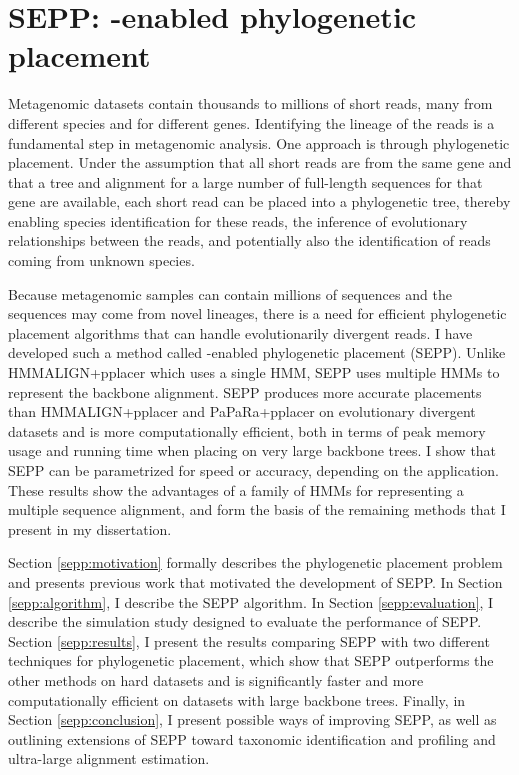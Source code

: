 \chapter{SEPP: \sate-enabled phylogenetic placement}\label{sepp_chapter}
%
Metagenomic datasets contain thousands to millions of short
reads, many from different species and for different genes.
Identifying the lineage of the reads is a fundamental step
in metagenomic analysis.  One approach is through phylogenetic
placement.  Under the assumption that all short reads are from
the same gene and that a tree and alignment for a large
number of full-length sequences for that gene are 
available, each short read  can be placed into a phylogenetic
tree, thereby enabling species identification for these reads, 
the inference of evolutionary relationships between
the reads, and potentially also the identification of reads coming
from unknown species.  

Because metagenomic samples can contain millions of sequences and the sequences may come from novel lineages, there is a need for efficient phylogenetic placement algorithms that can handle evolutionarily divergent reads.  I
have developed such a method called \sate-enabled phylogenetic placement (SEPP).  Unlike
HMMALIGN+pplacer which uses a single HMM, SEPP uses multiple HMMs to represent the backbone alignment.  SEPP produces more accurate placements than HMMALIGN+pplacer and PaPaRa+pplacer
on evolutionary divergent datasets and is more computationally efficient, both in 
terms of peak memory usage and running time when placing on very large backbone trees.
I show that SEPP can be parametrized for speed or accuracy, depending on the application.  These results
show the advantages of a family of HMMs for representing a multiple sequence alignment, and form the basis of the remaining methods that I present in my dissertation. 

Section \ref{sepp:motivation} formally describes the phylogenetic placement problem and presents previous work that motivated the development of SEPP.  In Section \ref{sepp:algorithm}, I describe the SEPP algorithm.  In Section \ref{sepp:evaluation}, I describe the simulation study designed to evaluate the performance of SEPP.  Section \ref{sepp:results}, I present the results comparing SEPP with two different techniques for phylogenetic placement, which show that SEPP outperforms the other methods on hard datasets and is significantly faster and more computationally efficient on datasets with large backbone trees.  Finally, in Section \ref{sepp:conclusion}, I present possible ways of improving SEPP, as well as outlining extensions of SEPP toward taxonomic identification and profiling and ultra-large alignment estimation.
 

